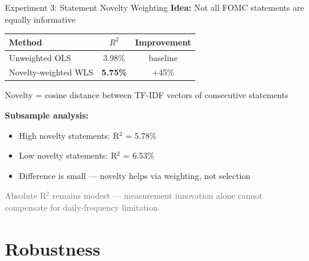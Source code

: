 \documentclass[aspectratio=169, 11pt]{beamer}
\begin{document}
\begin{frame}{Experiment 3: Statement Novelty Weighting}
\textbf{Idea:} Not all FOMC statements are equally informative

\vspace{0.5em}
\begin{tabular}{lcc}
\toprule
Method & $R^2$ & Improvement \\
\midrule
Unweighted OLS & 3.98\% & baseline \\
Novelty-weighted WLS & \textbf{5.75\%} & +45\% \\
\bottomrule
\end{tabular}

\vspace{0.5em}
Novelty = cosine distance between TF-IDF vectors of consecutive statements

\vspace{0.8em}
\textbf{Subsample analysis:}
\begin{itemize}
  \item High novelty statements: R$^2$ = 5.78\%
  \item Low novelty statements: R$^2$ = 6.53\%
  \item Difference is small --- novelty helps via weighting, not selection
\end{itemize}

\vspace{0.5em}
\textcolor{dimgray}{\small Absolute R$^2$ remains modest --- measurement innovation alone cannot compensate for daily-frequency limitation.}
\end{frame}

\section{Robustness}
\end{document}
